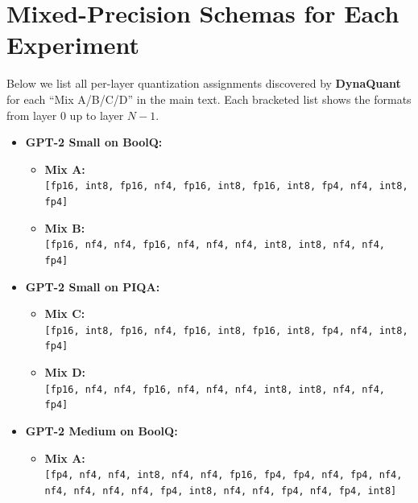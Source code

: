 \documentclass{article}
\begin{document}
	
	\balance
	
	
	
	\clearpage
	\appendix
	\section{Mixed-Precision Schemas for Each Experiment}
	\label{sec:appendix-schemas}
	
	{\small %
		
		Below we list all per-layer quantization assignments discovered by \textbf{DynaQuant} 
		for each “Mix A/B/C/D” in the main text. Each bracketed list shows
		the formats from layer 0 up to layer \(N-1\).
		
		\begin{itemize}
			\item \textbf{GPT-2 Small on BoolQ:}
			\begin{itemize}
				\item \textbf{Mix A:}\\
				\texttt{[fp16, int8, fp16, nf4, fp16, int8, fp16, int8, fp4, nf4, int8, fp4]}
				
				\item \textbf{Mix B:}\\
				\texttt{[fp16, nf4, nf4, fp16, nf4, nf4, nf4, int8, int8, nf4, nf4, fp4]}
			\end{itemize}
			\item \textbf{GPT-2 Small on PIQA:}
			\begin{itemize}
				\item \textbf{Mix C:}\\
				\texttt{[fp16, int8, fp16, nf4, fp16, int8, fp16, int8, fp4, nf4, int8, fp4]}
				
				\item \textbf{Mix D:}\\
				\texttt{[fp16, nf4, nf4, fp16, nf4, nf4, nf4, int8, int8, nf4, nf4, fp4]}
			\end{itemize}
			\item \textbf{GPT-2 Medium on BoolQ:}
			\begin{itemize}
				\item \textbf{Mix A:}\\
				\texttt{[fp4, nf4, nf4, int8, nf4, nf4, fp16, fp4, fp4, nf4, fp4, nf4, nf4, nf4, nf4, nf4, fp4, int8, nf4, nf4, fp4, nf4, fp4, int8]}
				

\end{itemize}
\end{itemize}}
\end{document}
